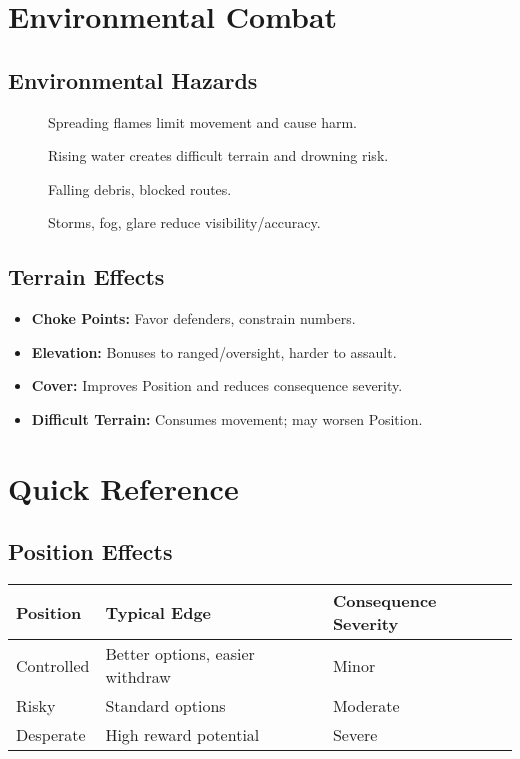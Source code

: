 \section{Environmental Combat}
\label{sec:environmental-combat}
\subsection{Environmental Hazards}
\label{subsec:environmental-hazards}
\begin{description}
  \item[] Spreading flames limit movement and cause harm.
  \item[] Rising water creates difficult terrain and drowning risk.
  \item[] Falling debris, blocked routes.
  \item[] Storms, fog, glare reduce visibility/accuracy.
\end{description}
\subsection{Terrain Effects}
\label{subsec:terrain-effects}
\begin{itemize}
  \item \textbf{Choke Points:} Favor defenders, constrain numbers.
  \item \textbf{Elevation:} Bonuses to ranged/oversight, harder to assault.
  \item \textbf{Cover:} Improves Position and reduces consequence severity.
  \item \textbf{Difficult Terrain:} Consumes movement; may worsen Position.
\end{itemize}

\section{Quick Reference}
\label{sec:combat-quick-ref}

\subsection{Position Effects}
\label{subsec:position-quick-ref}
\begin{center}
\begin{tabular}{lll}
\toprule
\textbf{Position} & \textbf{Typical Edge} & \textbf{Consequence Severity} \\
\midrule
Controlled & Better options, easier withdraw & Minor \\
Risky      & Standard options               & Moderate \\
Desperate  & High reward potential           & Severe \\
\bottomrule
\end{tabular}
\end{center}

